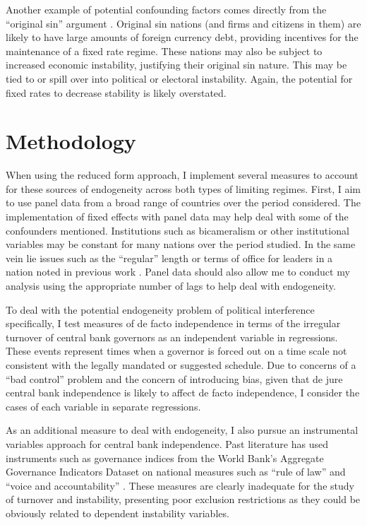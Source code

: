 \documentclass{article}
\begin{document}
    Another example of potential confounding factors comes directly from the “original sin” argument \citep{eichengreen_other_2005}. Original sin nations (and firms and citizens in them) are likely to have large amounts of foreign currency debt, providing incentives for the maintenance of a fixed rate regime. These nations may also be subject to increased economic instability, justifying their original sin nature. This may be tied to or spill over into political or electoral instability. Again, the potential for fixed rates to decrease stability is likely overstated.
    
    \section*{Methodology}

    When using the reduced form approach, I implement several measures to account for these sources of endogeneity across both types of limiting regimes. First, I aim to use panel data from a broad range of countries over the period considered. The implementation of fixed effects with panel data may help deal with some of the confounders mentioned. Institutions such as bicameralism or other institutional variables may be constant for many nations over the period studied. In the same vein lie issues such as the “regular” length or terms of office for leaders in a nation noted in previous work \citep{bernhard_political_2002-1}. Panel data should also allow me to conduct my analysis using the appropriate number of lags to help deal with endogeneity.

    To deal with the potential endogeneity problem of political interference specifically, I test measures of de facto independence in terms of the irregular turnover of central bank governors as an independent variable in regressions. These events represent times when a governor is forced out on a time scale not consistent with the legally mandated or suggested schedule. Due to concerns of a “bad control” problem and the concern of introducing bias, given that de jure central bank independence is likely to affect de facto independence, I consider the cases of each variable in separate regressions.

    As an additional measure to deal with endogeneity, I also pursue an instrumental variables approach for central bank independence. Past literature has used instruments such as governance indices from the World Bank’s Aggregate Governance Indicators Dataset on national measures such as “rule of law” and “voice and accountability” \citep{crowe_central_2008}. These measures are clearly inadequate for the study of turnover and instability, presenting poor exclusion restrictions as they could be obviously related to dependent instability variables. 
\end{document}
